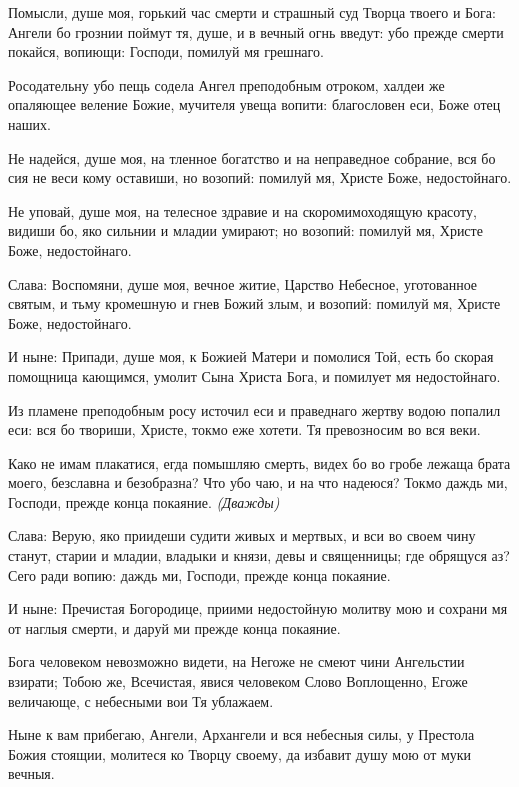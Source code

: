 

Помысли, душе моя, горький час смерти и страшный суд Творца твоего и Бога: Ангели бо грознии поймут тя, душе, и в вечный огнь введут: убо прежде смерти покайся, вопиющи: Господи, помилуй мя грешнаго.




Росодательну убо пещь содела Ангел преподобным отроком, халдеи же опаляющее веление Божие, мучителя увеща вопити: благословен еси, Боже отец наших.


Не надейся, душе моя, на тленное богатство и на неправедное собрание, вся бо сия не веси кому оставиши, но возопий: помилуй мя, Христе Боже, недостойнаго.


Не уповай, душе моя, на телесное здравие и на скоромимоходящую красоту, видиши бо, яко сильнии и младии умирают; но возопий: помилуй мя, Христе Боже, недостойнаго.


Слава: Воспомяни, душе моя, вечное житие, Царство Небесное, уготованное святым, и тьму кромешную и гнев Божий злым, и возопий: помилуй мя, Христе Боже, недостойнаго.


И ныне: Припади, душе моя, к Божией Матери и помолися Той, есть бо скорая помощница кающимся, умолит Сына Христа Бога, и помилует мя недостойнаго.




Из пламене преподобным росу источил еси и праведнаго жертву водою попалил еси: вся бо твориши, Христе, токмо еже хотети. Тя превозносим во вся веки.


Како не имам плакатися, егда помышляю смерть, видех бо во гробе лежаща брата моего, безславна и безобразна? Что убо чаю, и на что надеюся? Токмо даждь ми, Господи, прежде конца покаяние. \itshape (Дважды)\normalfont{}


Слава: Верую, яко приидеши судити живых и мертвых, и вси во своем чину станут, старии и младии, владыки и князи, девы и священницы; где обрящуся аз? Сего ради вопию: даждь ми, Господи, прежде конца покаяние.


И ныне: Пречистая Богородице, приими недостойную молитву мою и сохрани мя от наглыя смерти, и даруй ми прежде конца покаяние.




Бога человеком невозможно видети, на Негоже не смеют чини Ангельстии взирати; Тобою же, Всечистая, явися человеком Слово Воплощенно, Егоже величающе, с небесными вои Тя ублажаем.


Ныне к вам прибегаю, Ангели, Архангели и вся небесныя силы, у Престола Божия стоящии, молитеся ко Творцу своему, да избавит душу мою от муки вечныя.


